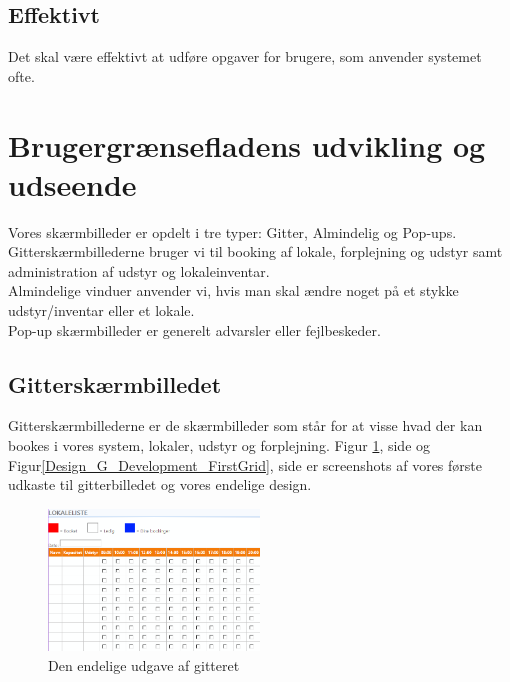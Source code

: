 \subsection{Effektivt}
Det skal være effektivt at udføre opgaver for brugere, som anvender systemet ofte.

\section{Brugergrænsefladens udvikling og udseende}
\label{Design_G_Development}
Vores skærmbilleder er opdelt i tre typer: Gitter, Almindelig og Pop-ups. 
\\Gitterskærmbillederne bruger vi til booking af lokale, forplejning og udstyr samt administration af udstyr og lokaleinventar.
\\Almindelige vinduer anvender vi, hvis man skal ændre noget på et stykke udstyr/inventar eller et lokale.
\\Pop-up skærmbilleder er generelt advarsler eller fejlbeskeder.

\subsection{Gitterskærmbilledet}
\label{Design_G_Development_Grid}
Gitterskærmbillederne er de skærmbilleder som står for at visse hvad der kan bookes i vores system, lokaler, udstyr og forplejning.
Figur \ref{Design_G_Development_FinalGrid}, side \pageref{Design_G_Development_FinalGrid} og Figur\ref{Design_G_Development_FirstGrid}, side \pageref{Design_G_Development_FirstGrid} er screenshots af vores første udkaste til gitterbilledet og vores endelige design.
\begin{figure}[h!]
  \centering
    \includegraphics[width=0.5\textwidth]{Appendix/GUI-Prototype/DigitalMockup/GridEksempel}
  \caption{Den endelige udgave af gitteret}
\label{Design_G_Development_FinalGrid}
\end{figure}

